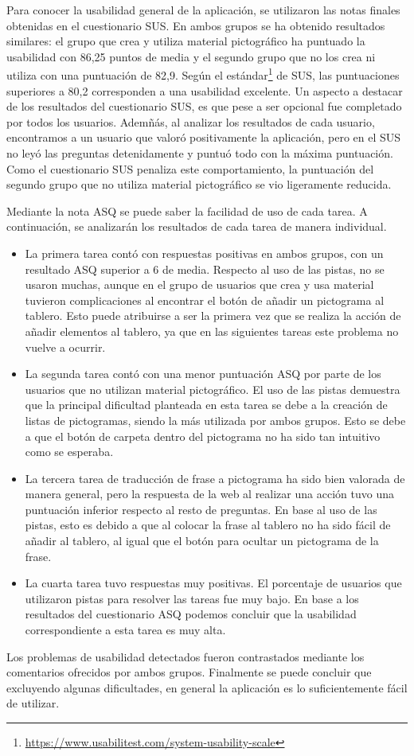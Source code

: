 Para conocer la usabilidad general de la aplicación, se utilizaron las notas finales obtenidas en el cuestionario SUS. En ambos grupos se ha obtenido resultados similares: el grupo que crea y utiliza material pictográfico ha puntuado la usabilidad con 86,25 puntos de media y el segundo grupo que no los crea ni utiliza con una puntuación de 82,9. Según el estándar\footnote{\url{https://www.usabilitest.com/system-usability-scale}} de SUS, las puntuaciones superiores a 80,2 corresponden a una usabilidad excelente. 
Un aspecto a destacar de los resultados del cuestionario SUS, es que pese a ser opcional fue completado por todos los usuarios. Ademñás, al analizar los resultados de cada usuario, encontramos a un usuario que valoró positivamente la aplicación, pero en el SUS no leyó las preguntas detenidamente y puntuó todo con la máxima puntuación. Como el cuestionario SUS penaliza este comportamiento, la puntuación del segundo grupo que no utiliza material pictográfico se vio ligeramente reducida. 

Mediante la nota ASQ se puede saber la facilidad de uso de cada tarea. A continuación, se analizarán los resultados de cada tarea de manera individual.

\begin{itemize}
	\item La primera tarea contó con respuestas positivas en ambos grupos, con un resultado ASQ superior a 6 de media. Respecto al uso de las pistas, no se usaron muchas, aunque en el grupo de usuarios que crea y usa material tuvieron complicaciones al encontrar el botón de añadir un pictograma al tablero. Esto puede atribuirse a ser la primera vez que se realiza la acción de añadir elementos al tablero, ya que en las siguientes tareas este problema no vuelve a ocurrir. 
	
	\item La segunda tarea contó con una menor puntuación ASQ por parte de los usuarios que no utilizan material pictográfico. El uso de las pistas demuestra que la principal dificultad planteada en esta tarea se debe a la creación de listas de pictogramas, siendo la más utilizada por ambos grupos. Esto se debe a que el botón de carpeta dentro del pictograma no ha sido tan intuitivo como se esperaba.
	
	
	\item La tercera tarea de traducción de frase a pictograma ha sido bien valorada de manera general, pero la respuesta de la web al realizar una acción tuvo una puntuación inferior respecto al resto de preguntas. En base al uso de las pistas, esto es debido a que al colocar la frase al tablero no ha sido fácil de añadir al tablero, al igual que el botón para ocultar un pictograma de la frase.
	
	
	\item La cuarta tarea tuvo respuestas muy positivas. El porcentaje de usuarios que utilizaron pistas para resolver las tareas fue muy bajo. En base a los resultados del cuestionario ASQ podemos concluir que la usabilidad correspondiente a esta tarea es muy alta.
\end{itemize}

Los problemas de usabilidad detectados fueron contrastados mediante los comentarios ofrecidos por ambos grupos. Finalmente se puede concluir que excluyendo algunas dificultades, en general la aplicación es lo suficientemente fácil de utilizar.
